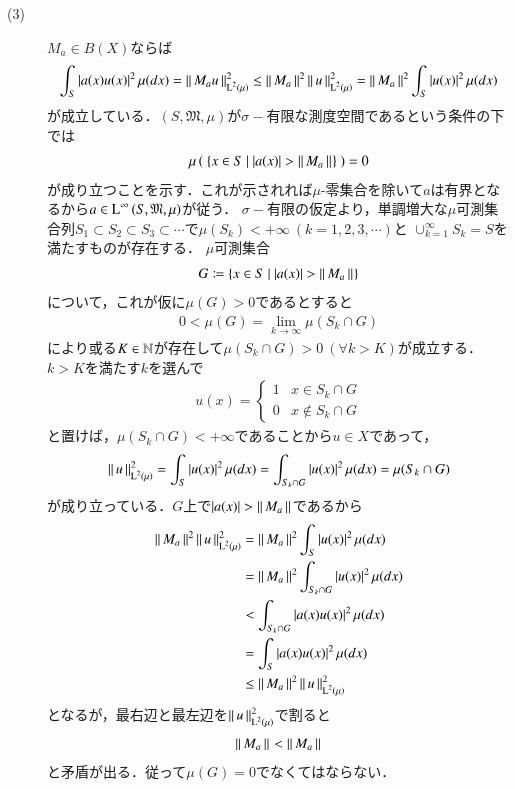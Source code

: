 \begin{prf}
\begin{description}
	\item[(3)] $M_a \in B(X)$ならば
		\begin{align}
			\int_{S} |a(x)u(x)|^2\, \mu(dx) 
			= \left\|\, M_au\, \right\|_{\operatorname{L}^{2} \left(\mu\right)}^2 \leq \left\|\, M_a\, \right\|_{}^2 \left\|\, u\, \right\|_{\operatorname{L}^{2} \left(\mu\right)}^2 
			= \left\|\, M_a\, \right\|_{}^2 \int_{S} |u(x)|^2\, \mu(dx)
		\end{align}
		が成立している．$(S, \mathfrak{M}, \mu)$が$\sigma-$有限な測度空間であるという条件の下では
		\begin{align}
			\mu\left(\ \{x \in S\ |\ |a(x)| > \left\|\, M_a\, \right\|_{}\}\ \right) = 0
		\end{align}
		が成り立つことを示す．これが示されれば$\mu$-零集合を除いて$a$は有界となるから$a \in \operatorname{L}^{\infty} \left(S, \mathfrak{M}, \mu\right)$が従う．
		$\sigma-$有限の仮定より，単調増大な$\mu$可測集合列$S_1 \subset S_2 \subset S_3 \subset \cdots$で$\mu(S_k) < +\infty\ (k=1,2,3,\cdots)$と
		$\cup_{k=1}^{\infty}S_k = S$を満たすものが存在する．
		$\mu$可測集合
		\begin{align}
			G \coloneqq \{x \in S\ |\ |a(x)| > \left\|\, M_a\, \right\|_{}\}
		\end{align}
		について，これが仮に$\mu(G) > 0$であるとすると
		\begin{align}
			0 < \mu(G) = \lim_{k \to \infty} \mu(S_k \cap G)
		\end{align}
		により或る$K \in \mathbb{N}$が存在して$\mu(S_k \cap G) > 0 \ (\forall k > K)$が成立する．$k > K$を満たす$k$を選んで
		\begin{align}
			u(x) = \begin{cases}
				1 & x \in S_k \cap G \\
				0 & x \notin S_k \cap G
			\end{cases}
		\end{align}
		と置けば，$\mu(S_k \cap G) < +\infty$であることから$u \in X$であって，
		\begin{align}
			\left\|\, u\, \right\|_{\operatorname{L}^{2} \left(\mu\right)}^2 = \int_{S} |u(x)|^2\, \mu(dx) = \int_{S_k \cap G} |u(x)|^2\, \mu(dx) = \mu(S_k \cap G)
		\end{align}
		が成り立っている．$G$上で$|a(x)| > \left\|\, M_a\, \right\|_{}$であるから
		\begin{align}
			\left\|\, M_a\, \right\|_{}^2 \left\|\, u\, \right\|_{\operatorname{L}^{2} \left(\mu\right)}^2 
			&= \left\|\, M_a\, \right\|_{}^2 \int_{S} |u(x)|^2\, \mu(dx) \\
			&= \left\|\, M_a\, \right\|_{}^2 \int_{S_k \cap G} |u(x)|^2\, \mu(dx) \\
			&< \int_{S_k \cap G} |a(x)u(x)|^2\, \mu(dx) \\
			&= \int_{S} |a(x)u(x)|^2\, \mu(dx) \\
			&\leq \left\|\, M_a\, \right\|_{}^2 \left\|\, u\, \right\|_{\operatorname{L}^{2} \left(\mu\right)}^2 
		\end{align}
		となるが，最右辺と最左辺を$\left\|\, u\, \right\|_{\operatorname{L}^{2} \left(\mu\right)}^2$で割ると
		\begin{align}
			\left\|\, M_a\, \right\|_{} < \left\|\, M_a\, \right\|_{}
		\end{align}
		と矛盾が出る．従って$\mu(G)=0$でなくてはならない．
		\QED
\end{description}
\end{prf}

